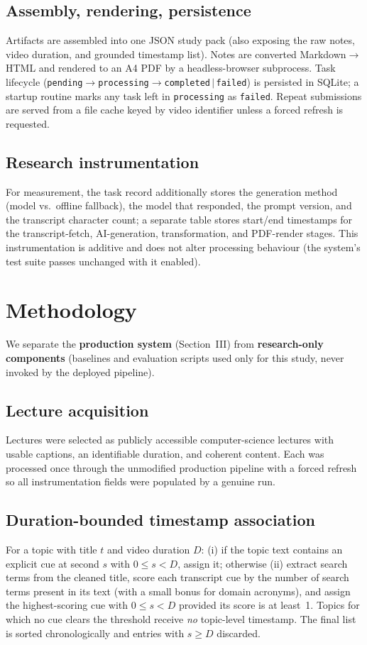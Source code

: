 \documentclass[conference]{IEEEtran}
\begin{document}
\subsection{Assembly, rendering, persistence}
Artifacts are assembled into one JSON study pack (also exposing the raw notes, video duration, and grounded timestamp list). Notes are converted Markdown$\rightarrow$HTML and rendered to an A4 PDF by a headless-browser subprocess. Task lifecycle (\texttt{pending}$\rightarrow$\texttt{processing}$\rightarrow$\texttt{completed}$\,|\,$\texttt{failed}) is persisted in SQLite; a startup routine marks any task left in \texttt{processing} as \texttt{failed}. Repeat submissions are served from a file cache keyed by video identifier unless a forced refresh is requested.

\subsection{Research instrumentation}
For measurement, the task record additionally stores the generation method (model vs.\ offline fallback), the model that responded, the prompt version, and the transcript character count; a separate table stores start/end timestamps for the transcript-fetch, AI-generation, transformation, and PDF-render stages. This instrumentation is additive and does not alter processing behaviour (the system's test suite passes unchanged with it enabled).

\section{Methodology}
We separate the \textbf{production system} (Section~III) from \textbf{research-only components} (baselines and evaluation scripts used only for this study, never invoked by the deployed pipeline).

\subsection{Lecture acquisition}
Lectures were selected as publicly accessible computer-science lectures with usable captions, an identifiable duration, and coherent content. Each was processed once through the unmodified production pipeline with a forced refresh so all instrumentation fields were populated by a genuine run.

\subsection{Duration-bounded timestamp association}\label{sec:ts}
For a topic with title $t$ and video duration $D$: (i) if the topic text contains an explicit cue at second $s$ with $0 \le s < D$, assign it; otherwise (ii) extract search terms from the cleaned title, score each transcript cue by the number of search terms present in its text (with a small bonus for domain acronyms), and assign the highest-scoring cue with $0 \le s < D$ provided its score is at least~1. Topics for which no cue clears the threshold receive \emph{no} topic-level timestamp. The final list is sorted chronologically and entries with $s \ge D$ discarded.
\end{document}

